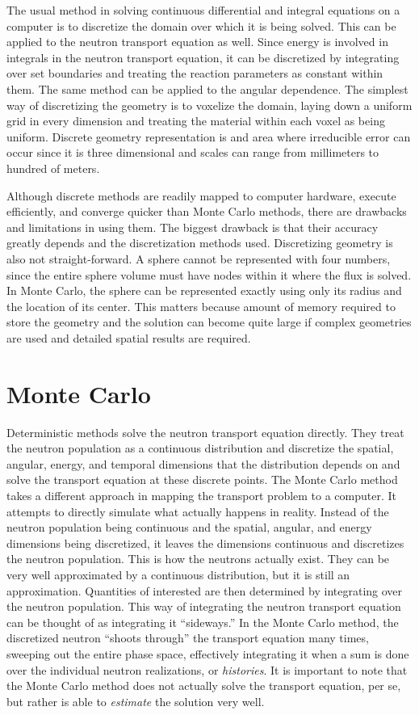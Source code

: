 The usual method in solving continuous differential and integral equations on a computer is to discretize the domain over which it is being solved.  This can be applied to the neutron transport equation as well.  Since energy is involved in integrals in the neutron transport equation, it can be discretized by integrating over set boundaries and treating the reaction parameters as constant within them.  The same method can be applied to the angular dependence.   The simplest way of discretizing the geometry is to voxelize the domain, laying down a uniform grid in every dimension and treating the material within each voxel as being uniform.  Discrete geometry representation is and area where irreducible error can occur since it is three dimensional and scales can range from millimeters to hundred of meters.   

Although discrete methods are readily mapped to computer hardware, execute efficiently, and converge quicker than Monte Carlo methods, there are drawbacks and limitations in using them.  The biggest drawback is that their accuracy greatly depends and the discretization methods used.  Discretizing geometry is also not straight-forward.  A sphere cannot be represented with four numbers, since the entire sphere volume must have nodes within it where the flux is solved.  In Monte Carlo, the sphere can be represented exactly using only its radius and the location of its center.  This matters because amount of memory required to store the geometry and the solution can become quite large if complex geometries are used and detailed spatial results are required.

\section{Monte Carlo}

Deterministic methods solve the neutron transport equation directly.  They treat the neutron population as a continuous distribution and discretize the spatial, angular, energy, and temporal dimensions that the distribution depends on and solve the transport equation at these discrete points.  The Monte Carlo method takes a different approach in mapping the transport problem to a computer.  It attempts to directly simulate what actually happens in reality.  Instead of the neutron population being continuous and the spatial, angular, and energy dimensions being discretized, it leaves the dimensions continuous and discretizes the neutron population.  This is how the neutrons actually exist.  They can be very well approximated by a continuous distribution, but it is still an approximation.  Quantities of interested are then determined by integrating over the neutron population.   This way of integrating the neutron transport equation can be thought of as integrating it ``sideways.''  In the Monte Carlo method, the discretized neutron ``shoots through'' the transport equation many times, sweeping out the entire phase space, effectively integrating it when a sum is done over the individual neutron realizations, or \emph{histories}.  It is important to note that the Monte Carlo method does not actually solve the transport equation, per se, but rather is able to \emph{estimate} the solution very well.

